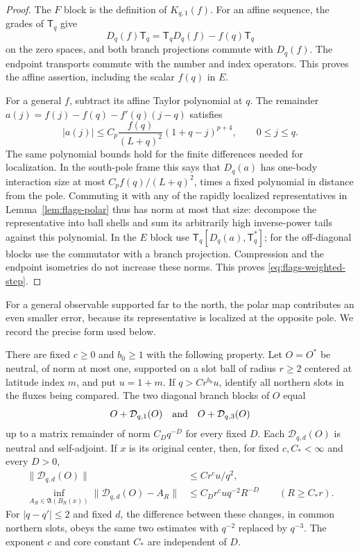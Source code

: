 \begin{proof}
The $F$ block is the definition of $K_{q,1}(f)$.  For an affine sequence,
the grades of $\mathsf T_q$ give
\[
 D_q(f)\mathsf T_q=\mathsf T_qD_q(f)-f(q)\mathsf T_q
\]
on the zero spaces, and both branch projections commute with $D_q(f)$.
The endpoint transports commute with the number and index operators.
This proves the affine assertion, including the scalar $f(q)$ in $E$.

For a general $f$, subtract its affine Taylor polynomial at $q$.
The remainder $a(j)=f(j)-f(q)-f'(q)(j-q)$ satisfies
\[
 |a(j)|\leq C_p\frac{f(q)}{(L+q)^2}
                   (1+q-j)^{p+4},\qquad 0\leq j\leq q.
\]
The same polynomial bounds hold for the finite differences needed for
localization.  In the south-pole frame this says that $D_q(a)$ has
one-body interaction size at most $C_pf(q)/(L+q)^2$, times a fixed
polynomial in distance from the pole.  Commuting it with any of the
rapidly localized representatives in Lemma~\ref{lem:flags-polar} thus
has norm at most that size: decompose the representative into ball
shells and sum its arbitrarily high inverse-power tails against this
polynomial.  In the $E$ block use
$\mathsf T_q[D_q(a),\mathsf T_q^*]$; for the off-diagonal blocks use the commutator with
a branch projection.  Compression and the endpoint isometries do not
increase these norms.  This proves \eqref{eq:flags-weighted-step}.
\end{proof}

For a general observable supported far to the north, the polar map
contributes an even smaller error, because its representative is
localized at the opposite pole.  We record the precise form used below.

\begin{lemma}
\label{lem:flags-northern-step}
There are fixed $c\geq0$ and $b_0\geq1$ with the following property.
Let $O=O^*$ be neutral, of norm at most one, supported on a slot ball of
radius $r\geq2$ centered at latitude index $m$, and put $u=1+m$.
If $q>C r^{b_0}u$, identify all northern slots in the fluxes being
compared.  The two diagonal branch blocks of $O$ equal
\[
 O+\mathcal D_{q,1}(O)\quad\hbox{and}\quad
 O+\mathcal D_{q,3}(O)
\]
up to a matrix remainder of norm $C_Dq^{-D}$ for every fixed $D$.
Each $\mathcal D_{q,d}(O)$ is neutral and self-adjoint.  If $x$ is its
original center, then, for fixed $c,C_*<\infty$ and every $D>0$,
\begin{equation}
 \begin{split}
 \|\mathcal D_{q,d}(O)\|&\leq Cr^cu/q^2,\\
 \inf_{A_R\in\mathfrak A(B_R(x))}
       \|\mathcal D_{q,d}(O)-A_R\|
  &\leq C_Dr^cu q^{-2}R^{-D}\qquad(R\geq C_*r).
 \end{split}
 \label{eq:flags-northern-size}
\end{equation}
For $|q-q'|\leq2$ and fixed $d$, the difference between these changes,
in common northern slots, obeys the same two estimates with $q^{-2}$
replaced by $q^{-3}$.  The exponent $c$ and core constant $C_*$ are
independent of $D$.
\end{lemma}

